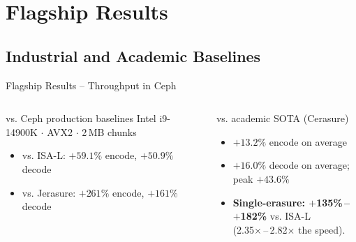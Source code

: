 \documentclass[aspectratio=169]{beamer}
\begin{document}
\section{Flagship Results}
\subsection{Industrial and Academic Baselines}

\begin{frame}[t]{Flagship Results -- Throughput in Ceph}
\footnotesize
\begin{columns}[T,totalwidth=\textwidth]
  \begin{block}{vs. Ceph production baselines}
  \scriptsize
  Intel i9-14900K $\cdot$ AVX2 $\cdot$ 2\,MB chunks
  \begin{itemize}
    \item vs. ISA-L: \textbf{$+59.1\%$} encode, \textbf{$+50.9\%$} decode
    \item vs. Jerasure: \textbf{$+261\%$} encode, \textbf{$+161\%$} decode
  \end{itemize}

  \vspace{0.2em}
  \end{block}

  \begin{block}{vs. academic SOTA (Cerasure)}
  \scriptsize
  \begin{itemize}
    \item \textbf{$+13.2\%$} encode on average
    \item \textbf{$+16.0\%$} decode on average; peak $+43.6\%$
    \item \textbf{Single-erasure: $+$135\%\,--\,$+$182\%} vs. ISA-L \\(2.35$\times$\,--\,2.82$\times$ the speed).
  \end{itemize}


\end{block}
\end{columns}
\end{frame}
\end{document}
